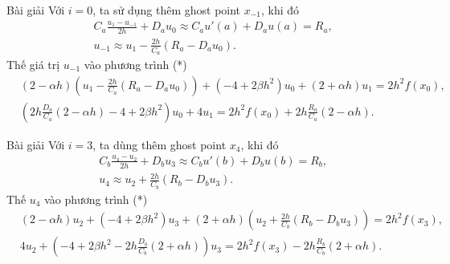 \documentclass[9pt]{beamer}
\begin{document}
\begin{frame}
    \begin{exampleblock}{Bài giải}
    Với $i = 0$, ta sử dụng thêm ghost point $x_{-1}$, khi đó
    \begin{align*}
        & C_a \frac{u_1 - u_{-1}}{2h} + D_a u_0 \approx C_a u'(a) + D_a u(a) = R_a, \\
        & u_{-1} \approx u_1 - \frac{2h}{C_a}(R_a - D_a u_0).
    \end{align*}
    Thế giá trị $u_{-1}$ vào phương trình (*)
    \begin{align*}
        & (2 - \alpha h) \left(u_1 - \frac{2h}{C_a}(R_a - D_a u_0)\right) + (-4 + 2\beta h^2)u_0 + (2 + \alpha h)u_1 = 2h^2f(x_0), \\
        & \left(2h\frac{D_a}{C_a}(2 - \alpha h) - 4 + 2\beta h^2\right)u_0 + 4u_1 = 2h^2f(x_0) + 2h\frac{R_a}{C_a}(2 - \alpha h).
    \end{align*}
    \end{exampleblock}
\end{frame}

\begin{frame}
    \begin{exampleblock}{Bài giải}
    Với $i = 3$, ta dùng thêm ghost point $x_4$, khi đó
    \begin{align*}
        & C_b \frac{u_4 - u_2}{2h} + D_b u_3 \approx C_b u'(b) + D_b u(b) = R_b, \\
        & u_4 \approx u_2 + \frac{2h}{C_b}(R_b - D_b u_3).
    \end{align*}
    Thế $u_4$ vào phương trình (*)
    \begin{align*}
        & (2 - \alpha h) u_2 + (-4 + 2\beta h^2) u_3 + (2 + \alpha h) \left(u_2 + \frac{2h}{C_b}(R_b - D_b u_3)\right) = 2h^2 f(x_3), \\
        & 4 u_2 + \left(-4 + 2\beta h^2 - 2h\frac{D_b}{C_b}(2 + \alpha h)\right) u_3 = 2h^2 f(x_3) - 2h \frac{R_b}{C_b}(2 + \alpha h).
    \end{align*}
    \end{exampleblock}
\end{frame}
\end{document}
